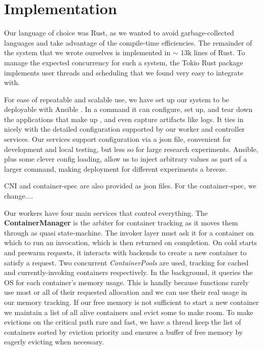 \section{Implementation}

Our language of choice was Rust, as we wanted to avoid garbage-collected languages and take advantage of the compile-time efficiencies.
The remainder of the system that we wrote ourselves is implemented in $\sim$ 13k lines of Rust.
To manage the expected concurrency for such a system, the Tokio Rust package implements user threads and scheduling that we found very easy to integrate with.

For ease of repeatable and scalable use, we have set up our system to be deployable with Ansible \cite{}.
In a command it can configure, set up, and tear down the applications that make up \sysname{}, and even capture artifacts like logs.
It ties in nicely with the detailed configuration supported by our worker and controller services.
Our services support configuration via a json file, convenient for development and local testing, but less so for large research experiments.
Ansible, plus some clever config loading, allow us to inject arbitrary values as part of a larger command, making deployment for different experiments a breeze.

CNI and container-spec are also provided as json files. For the container-spec, we change....

Our workers have four main services that control everything.
The \textbf{ContainerManager} is the arbiter for container tracking as it moves them through as quasi state-machine.
The invoker layer must ask it for a container on which to run an invocation, which is then returned on completion.
On cold starts and prewarm requests, it interacts with backends to create a new container to satisfy a request.
Two concurrent \emph{ContainerPools} are used, tracking for cached and currently-invoking containers respectively.
In the background, it queries the OS for each container's memory usage.
This is handly because functions rarely use most or all of their requested allocation and we can use their real usage in our memory tracking.
If our free memory is not sufficient to start a new container we maintain a list of all alive containers and evict some to make room.
To make evictions on the critical path rare and fast, we have a thread keep the list of containers sorted by eviction priority and ensures a buffer of free memory by eagerly evicting when necessary.

